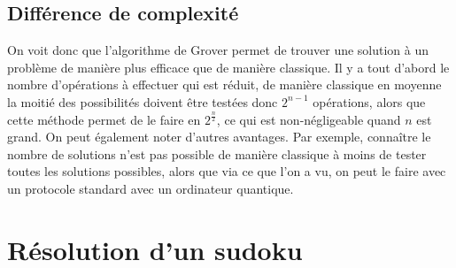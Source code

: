 \subsection{Différence de complexité}\label{subsec:difference-de-complexite}

On voit donc que l'algorithme de Grover permet de trouver une solution à un problème
de manière plus efficace que de manière classique.
Il y a tout d'abord le nombre d'opérations à effectuer qui est réduit, de manière classique
en moyenne la moitié des possibilités doivent être testées donc $2^{n-1}$ opérations,
alors que cette méthode permet de le faire en $2^{\frac{n}{2}}$, ce qui est non-négligeable
quand $n$ est grand.
On peut également noter d'autres avantages.
Par exemple, connaître le nombre de solutions n'est pas possible de manière classique
à moins de tester toutes les solutions possibles, alors que via ce que l'on a vu,
on peut le faire avec un protocole standard avec un ordinateur quantique.

\section{Résolution d'un sudoku}\label{sec:resolution-d'un-sudoku}

